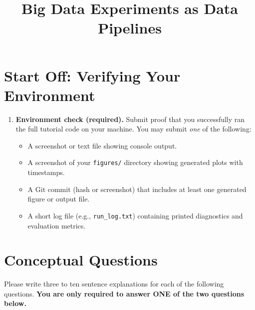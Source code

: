\documentclass[11pt]{article}
\title{ Big Data Experiments as Data Pipelines}
\author{ }
\date{ }
\begin{document}
\maketitle



\section*{Start Off: Verifying Your Environment}

\begin{enumerate}
\item \textbf{Environment check (required).}  
Submit proof that you successfully ran the full tutorial code on your machine. You may submit \emph{one} of the following:
\begin{itemize}
  \item A screenshot or text file showing console output.
  \item A screenshot of your \texttt{figures/} directory showing generated plots with timestamps.
  \item A Git commit (hash or screenshot) that includes at least one generated figure or output file.
  \item A short log file (e.g., \texttt{run\_log.txt}) containing printed diagnostics and evaluation metrics.
\end{itemize}
\end{enumerate}


\section*{Conceptual Questions}

Please write three to ten sentence explanations for each of the following questions.  
\textbf{You are only required to answer ONE of the two questions below.} \bigskip
\end{document}
